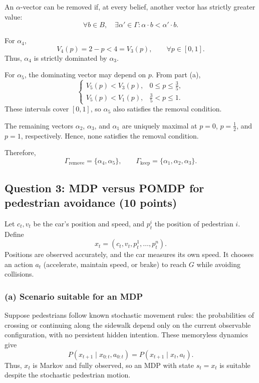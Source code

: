 \documentclass[11pt,a4paper]{article}
\begin{document}
An $\alpha$-vector can be removed if, at every belief,
another vector has strictly greater value:
\[
\forall b\in B,\quad
\exists\alpha'\in\Gamma:
\alpha\cdot b<\alpha'\cdot b.
\]

For $\alpha_4$,
\[
V_4(p)=2-p<4=V_3(p),\qquad \forall p\in[0,1].
\]
Thus, $\alpha_4$ is strictly dominated by $\alpha_3$.

For $\alpha_5$, the dominating vector may depend on $p$.
From part (a),
\[
\begin{cases}
V_5(p)<V_3(p), & 0\le p\le\frac35,\\
V_5(p)<V_1(p), & \frac35<p\le1.
\end{cases}
\]
These intervals cover $[0,1]$, so $\alpha_5$ also satisfies
the removal condition.

The remaining vectors $\alpha_2$, $\alpha_3$, and $\alpha_1$ are uniquely
maximal at $p=0$, $p=\frac12$, and $p=1$, respectively.
Hence, none satisfies the removal condition.

Therefore,
\[
\boxed{
\Gamma_{\mathrm{remove}}=\{\alpha_4,\alpha_5\},
\qquad
\Gamma_{\mathrm{keep}}=\{\alpha_1,\alpha_2,\alpha_3\}.
}
\]
\par
\endgroup

\clearpage
\subsection*{Question 3: MDP versus POMDP for pedestrian avoidance (10 points)}
\label{sec:a3}
\begingroup
\setlength{\parindent}{0pt}
\setlength{\parskip}{4pt}

Let $c_t,v_t$ be the car's position and speed, and $p_t^i$ the position
of pedestrian $i$. Define
\[
x_t=(c_t,v_t,p_t^1,\ldots,p_t^n).
\]
Positions are observed accurately, and the car measures its own speed.
It chooses an action $a_t$ (accelerate, maintain speed, or brake)
to reach $G$ while avoiding collisions.

\subsubsection*{(a) Scenario suitable for an MDP}

Suppose pedestrians follow known stochastic movement rules: the probabilities
of crossing or continuing along the sidewalk depend only on the current
observable configuration, with no persistent hidden intention.
These memoryless dynamics give
\[
P(x_{t+1}\mid x_{0:t},a_{0:t})
=P(x_{t+1}\mid x_t,a_t).
\]
Thus, $x_t$ is Markov and fully observed, so an MDP with state
$s_t=x_t$ is suitable despite the stochastic pedestrian motion.
\end{document}
